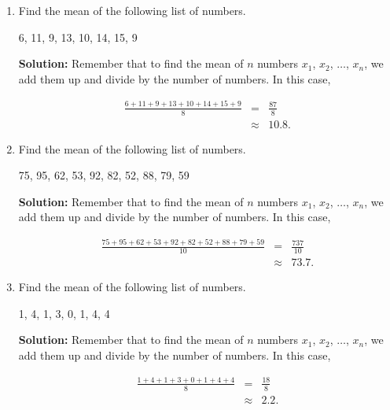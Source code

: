 \documentclass{article}
\begin{document}
\ActivityTitle[class=Statistics, number=1, name={Basic Parameters (Solutions)}]

\begin{enumerate}
\item Find the mean of the following list of numbers.

\begin{center}
6, 11, 9, 13, 10, 14, 15, 9
\end{center}

\textbf{Solution:} Remember that to find the mean of $n$ numbers $x_1$, $x_2$, $\ldots$, $x_n$, we add them up and divide by the number of numbers. In this case,

\begin{eqnarray*}
\frac{6 + 11 + 9 + 13 + 10 + 14 + 15 + 9}{8} & = & \frac{87}{8} \\
 & \approx & 10.8.
\end{eqnarray*}


  
\vspace{1cm}

\item Find the mean of the following list of numbers.

\begin{center}
75, 95, 62, 53, 92, 82, 52, 88, 79, 59
\end{center}

\textbf{Solution:} Remember that to find the mean of $n$ numbers $x_1$, $x_2$, $\ldots$, $x_n$, we add them up and divide by the number of numbers. In this case,

\begin{eqnarray*}
\frac{75 + 95 + 62 + 53 + 92 + 82 + 52 + 88 + 79 + 59}{10} & = & \frac{737}{10} \\
 & \approx & 73.7.
\end{eqnarray*}


  
\vspace{1cm}

\item Find the mean of the following list of numbers.

\begin{center}
1, 4, 1, 3, 0, 1, 4, 4
\end{center}

\textbf{Solution:} Remember that to find the mean of $n$ numbers $x_1$, $x_2$, $\ldots$, $x_n$, we add them up and divide by the number of numbers. In this case,

\begin{eqnarray*}
\frac{1 + 4 + 1 + 3 + 0 + 1 + 4 + 4}{8} & = & \frac{18}{8} \\
 & \approx & 2.2.
\end{eqnarray*}



\end{enumerate}
\end{document}
